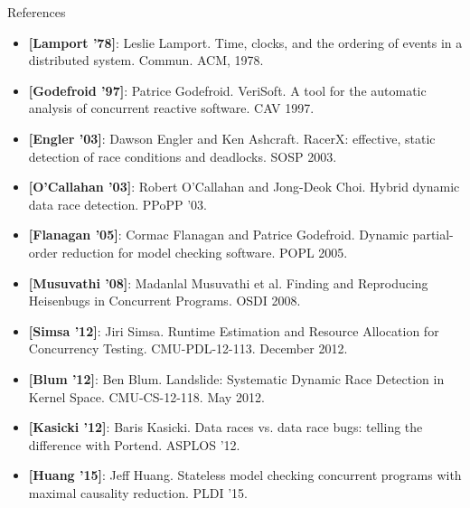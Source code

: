 \documentclass[xcolor=dvipsnames]{beamer}
\begin{document}
\begin{frame}{References}
	\scriptsize
	\begin{itemize}
		\item {\bf [Lamport '78]}:
			Leslie Lamport. Time, clocks, and the ordering of events in a distributed system.
			Commun. ACM, 1978.
		\item {\bf [Godefroid '97]}: Patrice Godefroid.
			VeriSoft. A tool for the automatic analysis of concurrent reactive software. CAV 1997.
		\item {\bf [Engler '03]}: Dawson Engler and Ken Ashcraft.
			RacerX: effective, static detection of race conditions and deadlocks. SOSP 2003.
		\item {\bf [O'Callahan '03]}: Robert O'Callahan and Jong-Deok Choi.
			Hybrid dynamic data race detection. PPoPP '03.
		\item {\bf [Flanagan '05]}: Cormac Flanagan and Patrice Godefroid. Dynamic partial-order reduction for
			model checking software. POPL 2005.
		\item {\bf [Musuvathi '08]}: Madanlal Musuvathi et al. Finding and Reproducing Heisenbugs in Concurrent
			Programs. OSDI 2008.
		\item {\bf [Simsa '12]}: Jiri Simsa. Runtime Estimation and Resource Allocation for
			Concurrency Testing. CMU-PDL-12-113. December 2012.
		\item {\bf [Blum '12]}: Ben Blum. Landslide: Systematic Dynamic Race Detection in Kernel
			Space. CMU-CS-12-118. May 2012.
		\item {\bf [Kasicki '12]}: Baris Kasicki. Data races vs. data race bugs: telling the difference with Portend. ASPLOS '12.
		\item {\bf [Huang '15]}: Jeff Huang. Stateless model checking concurrent programs with maximal causality reduction. PLDI '15.

	\end{itemize}
\end{frame}
\end{document}
